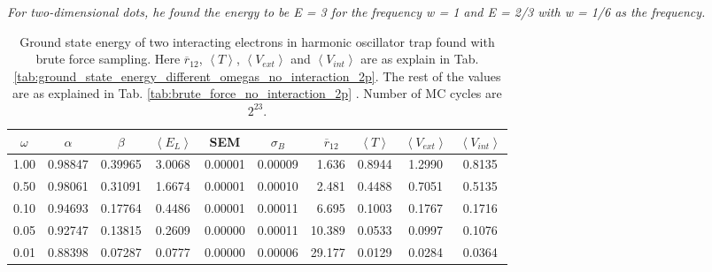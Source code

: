 \textit{For two-dimensional dots, he found the energy to be E = 3 for the frequency w = 1 and E = 2/3 with w = 1/6 as the frequency.} \cite{taut1993two}

\begin{table}[H]\caption{Ground state energy of two interacting electrons in harmonic oscillator trap found with brute force sampling. Here $\overline{r}_{12}$,  $\left< T \right>$, $\left< V_{ext}\right>$  and $\left<V_{int} \right>$ are as explain in Tab. \ref{tab:ground_state_energy_different_omegas_no_interaction_2p}. The rest of the values are as explained in Tab. \ref{tab:brute_force_no_interaction_2p} . Number of MC cycles are $2^{23}$.}\label{tab:ground_state_energy_brute_force_interaction}
\center
\begin{tabular}{c|cccccrccc}
$\omega$ & $\alpha$ & $\beta$ & $\left< E_L \right>$ & SEM & $\sigma_B$ &  $\overline{r}_{12} \,\,\,$ & $\left< T \right>$  & $\left< V_{ext}\right>$ & $\left<V_{int} \right>$  \\ \hline
1.00 & 0.98847 & 0.39965 & 3.0068 & 0.00001 & 0.00009 & 1.636 & 0.8944 & 1.2990 & 0.8135\\
0.50 & 0.98061 & 0.31091 & 1.6674 & 0.00001 & 0.00010 & 2.481 & 0.4488 & 0.7051 & 0.5135\\
0.10 & 0.94693 & 0.17764 & 0.4486 & 0.00001 & 0.00011 & 6.695 & 0.1003 & 0.1767 & 0.1716\\
0.05 & 0.92747 & 0.13815 & 0.2609 & 0.00000 & 0.00011 & 10.389 & 0.0533 & 0.0997 & 0.1076\\
0.01 & 0.88398 & 0.07287 & 0.0777 & 0.00000 & 0.00006 & 29.177 & 0.0129 & 0.0284 & 0.0364\\
\end{tabular}
\end{table}

